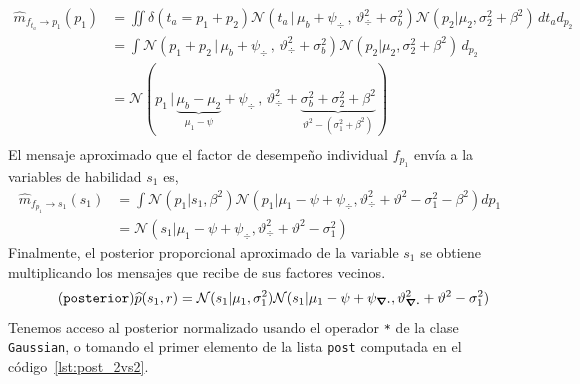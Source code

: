 \documentclass[a4paper,11pt]{book}
\newcommand{\N}{\mathcal{N}}
\theoremstyle{definition}
\begin{document}
%
\begin{equation}%
\begin{split}
\widehat{m}_{f_{t_a} \rightarrow p_1}(p_1) &= \iint \delta(t_a = p_1 + p_2) \N(t_a \, | \, \mu_b + \psi_{\div} \, , \, \vartheta_{\div}^2 + \sigma_b^2) \N(p_2 | \mu_2 , \sigma_2^2 + \beta^2)  \, d{t_a} d_{p_2} \\
& = \int \N(p_1 + p_2 \, | \, \mu_b + \psi_{\div} \, , \, \vartheta_{\div}^2 + \sigma_b^2) \N(p_2 | \mu_2 , \sigma_2^2+ \beta^2 )   \, d_{p_2} \\
& = \N( p_1 \,|\,  \underbrace{\mu_b - \mu_2}_{\mu_1-\psi} + \psi_{\div}  \,,\,\vartheta_{\div}^2 + \underbrace{\sigma_b^2 + \sigma_2^2 + \beta^2}_{\vartheta^2 - (\sigma_1^2 + \beta^2)})  \\
\end{split}
\end{equation}
%
El mensaje aproximado que el factor de desempeño individual $f_{p_1}$ envía a la variables de habilidad $s_1$ es,
%
\begin{equation}%
\begin{split}
\widehat{m}_{f_{p_1} \rightarrow s_1}(s_1) & = \int \N(p_1|s_1,\beta^2) \N(p_1| \mu_1 - \psi + \psi_{\div}, \vartheta_{\div}^2 + \vartheta^2 - \sigma_1^2 - \beta^2)dp_1 \\
& = \N(s_1| \mu_1 - \psi + \psi_{\div}, \vartheta_{\div}^2 + \vartheta^2 - \sigma_1^2)
\end{split}
\end{equation}
%
Finalmente, el posterior proporcional aproximado de la variable $s_1$ se obtiene multiplicando los mensajes que recibe de sus factores vecinos.
%
\begin{equation}\label{eq:^p_s} \tag{\texttt{posterior}}
 \widehat{p}(s_1, r) = \N(s_1|\mu_1, \sigma_1^2) \N(s_1| \mu_1 - \psi + \psi_{\div}, \vartheta_{\div}^2 + \vartheta^2 - \sigma_1^2)
\end{equation}
%
Tenemos acceso al posterior normalizado usando el operador \texttt{*} de la clase \texttt{Gaussian}, o tomando el primer elemento de la lista \texttt{post} computada en el código~\ref{lst:post_2vs2}.
%
\end{document}
